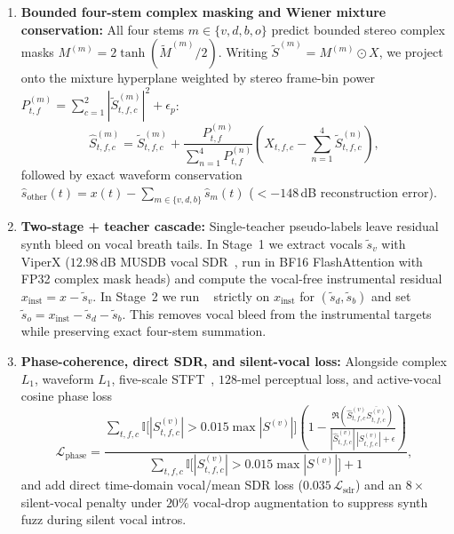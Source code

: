 \begin{enumerate}
  \item \textbf{Bounded four-stem complex masking and Wiener mixture conservation:} All four stems $m \in \{v, d, b, o\}$ predict bounded stereo complex masks $M^{(m)} = 2 \tanh(\tilde{M}^{(m)} / 2)$. Writing $\tilde{S}^{(m)} = M^{(m)} \odot X$, we project onto the mixture hyperplane weighted by stereo frame-bin power $P^{(m)}_{t,f} = \sum_{c=1}^2 |\tilde{S}^{(m)}_{t,f,c}|^2 + \epsilon_p$:
  \begin{equation}
    \hat{S}^{(m)}_{t,f,c} = \tilde{S}^{(m)}_{t,f,c} + \frac{P^{(m)}_{t,f}}{\sum_{n=1}^4 P^{(n)}_{t,f}} \left( X_{t,f,c} - \sum_{n=1}^4 \tilde{S}^{(n)}_{t,f,c} \right),
    \label{eq:wiener_proj}
  \end{equation}
  followed by exact waveform conservation $\hat{s}_{\text{other}}(t) = x(t) - \sum_{m \in \{v,d,b\}} \hat{s}_m(t)$ ($< -148$\,dB reconstruction error).
  \item \textbf{Two-stage  +  teacher cascade:} Single-teacher  pseudo-labels leave residual synth bleed on vocal breath tails. In Stage~1 we extract vocals $\tilde{s}_v$ with ViperX  ($12.98$\,dB MUSDB vocal SDR~\citep{lu2024bsroformer}, run in BF16 FlashAttention with FP32 complex mask heads) and compute the vocal-free instrumental residual $x_{\text{inst}} = x - \tilde{s}_v$. In Stage~2 we run ~\citep{rouard2023hybrid} strictly on $x_{\text{inst}}$ for $(\tilde{s}_d, \tilde{s}_b)$ and set $\tilde{s}_o = x_{\text{inst}} - \tilde{s}_d - \tilde{s}_b$. This removes vocal bleed from the instrumental targets while preserving exact four-stem summation.
  \item \textbf{Phase-coherence, direct SDR, and silent-vocal loss:} Alongside complex $L_1$, waveform $L_1$, five-scale STFT~\citep{yamamoto2020parallel}, $128$-mel perceptual loss, and active-vocal cosine phase loss
  \begin{equation}
    \mathcal{L}_{\text{phase}} = \frac{\sum_{t,f,c} \mathbb{I}\!\big[|S^{(v)}_{t,f,c}| > 0.015 \max |S^{(v)}|\big] \left(1 - \frac{\Re(\hat{S}^{(v)}_{t,f,c} \overline{S^{(v)}_{t,f,c}})}{|\hat{S}^{(v)}_{t,f,c}|\,|S^{(v)}_{t,f,c}| + \epsilon}\right)}{\sum_{t,f,c} \mathbb{I}\!\big[|S^{(v)}_{t,f,c}| > 0.015 \max |S^{(v)}|\big] + 1},
    \label{eq:phase_loss}
  \end{equation}
   and  add direct time-domain vocal/mean SDR loss ($0.035\,\mathcal{L}_{\text{sdr}}$) and an $8\times$ silent-vocal penalty under $20\%$ vocal-drop augmentation to suppress synth fuzz during silent vocal intros.
\end{enumerate}


